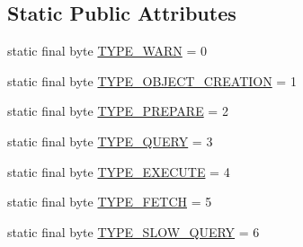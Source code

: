 \subsection*{Static Public Attributes}
\begin{DoxyCompactItemize}
\item 
static final byte \mbox{\hyperlink{classcom_1_1mysql_1_1jdbc_1_1profiler_1_1_profiler_event_a09239ec47cc814e66d678151c649c362}{T\+Y\+P\+E\+\_\+\+W\+A\+RN}} = 0
\item 
static final byte \mbox{\hyperlink{classcom_1_1mysql_1_1jdbc_1_1profiler_1_1_profiler_event_ad5c70376b24fea58a26f004a6ef96324}{T\+Y\+P\+E\+\_\+\+O\+B\+J\+E\+C\+T\+\_\+\+C\+R\+E\+A\+T\+I\+ON}} = 1
\item 
static final byte \mbox{\hyperlink{classcom_1_1mysql_1_1jdbc_1_1profiler_1_1_profiler_event_ad19a19412128007ed0c00a9fcd4053a7}{T\+Y\+P\+E\+\_\+\+P\+R\+E\+P\+A\+RE}} = 2
\item 
static final byte \mbox{\hyperlink{classcom_1_1mysql_1_1jdbc_1_1profiler_1_1_profiler_event_aa283ffd96cd013b7714c84b1a592df91}{T\+Y\+P\+E\+\_\+\+Q\+U\+E\+RY}} = 3
\item 
static final byte \mbox{\hyperlink{classcom_1_1mysql_1_1jdbc_1_1profiler_1_1_profiler_event_abdd68063adb3e03ed361c7559df4d401}{T\+Y\+P\+E\+\_\+\+E\+X\+E\+C\+U\+TE}} = 4
\item 
static final byte \mbox{\hyperlink{classcom_1_1mysql_1_1jdbc_1_1profiler_1_1_profiler_event_a6d3e740793e368162fd794382f622948}{T\+Y\+P\+E\+\_\+\+F\+E\+T\+CH}} = 5
\item 
static final byte \mbox{\hyperlink{classcom_1_1mysql_1_1jdbc_1_1profiler_1_1_profiler_event_a708d4df0927f033994b987028442c3f8}{T\+Y\+P\+E\+\_\+\+S\+L\+O\+W\+\_\+\+Q\+U\+E\+RY}} = 6
\end{DoxyCompactItemize}
